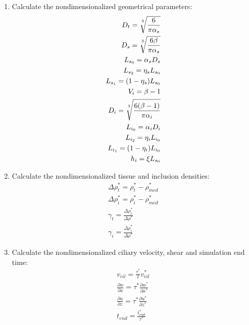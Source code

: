 \documentclass[10pt,a4paper]{article}
\def\non{\nonumber}
\def\p{\partial}
\def\l{\mathit{l}}
\begin{document}
\begin{enumerate}
	\color{black}
	\item Calculate the nondimensionalized geometrical parameters:
	\begin{eqnarray}\label{d2ndpars4a}
		D_t = \sqrt[\uproot{5}3]{\frac{6}{\pi \alpha_s}} \non \\
		D_s = \sqrt[\uproot{5}3]{\frac{6 \beta}{\pi \alpha_s}} \non \\
		L_{s_0} = \alpha_s D_s \non \\
		L_{s_2} = \eta_s L_{s_0} \non \\
		 L_{s_1} = (1 - \eta_s) L_{s_0} \non \\
		V_i = \beta - 1 \non \\
		D_i = \sqrt[\uproot{5}3]{\frac{6 (\beta-1)}{\pi \alpha_i}} \non \\
		L_{i_0} = \alpha_i D_i \non \\
		L_{i_2} = \eta_i L_{i_0} \non \\
		 L_{i_1} = (1 - \eta_i) L_{i_0} \non \\
		h_i = \xi L_{s_0} 
	\end{eqnarray}
	\item Calculate the nondimensionalized tissue and inclusion densities:
	\begin{eqnarray}\label{d2ndpars5}
		\Delta \rho_t^* = \rho_t^* - \rho^*_{med} \non \\
		\Delta \rho_i^* = \rho_i^* - \rho^*_{med} \non \\
		\gamma_t = \frac{\Delta \rho_t^*}{\Delta \rho^*} \non \\
		\gamma_i = \frac{\Delta \rho_i^*}{\Delta \rho^*}
	\end{eqnarray}
	\item Calculate the nondimensionalized ciliary velocity, shear and simulation end time:
	\begin{eqnarray}\label{d2ndpars6}
		v_{cil} = \frac{{\tau^*}}{\l}  v^*_{cil} \non \\
		\frac{\p w}{\p x} = \tau^* \frac{\p w^*}{\p x^*} \non \\
		\frac{\p u}{\p z} = \tau^* \frac{\p u^*}{\p z^*} \non \\
		t_{end} = \frac{t^*_{end}}{\tau^*}
	\end{eqnarray}
\end{enumerate}
\end{document}
